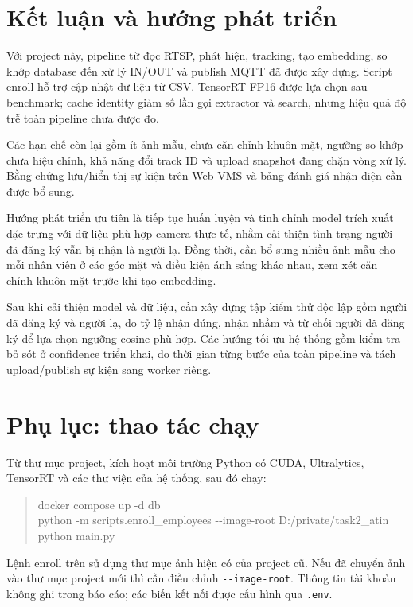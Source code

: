 \documentclass[11pt,a4paper]{article}
\begin{document}
\section{Kết luận và hướng phát triển}
Với project này, pipeline từ đọc RTSP, phát hiện, tracking, tạo embedding, so khớp database đến xử lý IN/OUT và publish MQTT đã được xây dựng. Script enroll hỗ trợ cập nhật dữ liệu từ CSV. TensorRT FP16 được lựa chọn sau benchmark; cache identity giảm số lần gọi extractor và search, nhưng hiệu quả độ trễ toàn pipeline chưa được đo.

Các hạn chế còn lại gồm ít ảnh mẫu, chưa căn chỉnh khuôn mặt, ngưỡng so khớp chưa hiệu chỉnh, khả năng đổi track ID và upload snapshot đang chặn vòng xử lý. Bằng chứng lưu/hiển thị sự kiện trên Web VMS và bảng đánh giá nhận diện cần được bổ sung.

Hướng phát triển ưu tiên là tiếp tục huấn luyện và tinh chỉnh model trích xuất đặc trưng với dữ liệu phù hợp camera thực tế, nhằm cải thiện tình trạng người đã đăng ký vẫn bị nhận là người lạ. Đồng thời, cần bổ sung nhiều ảnh mẫu cho mỗi nhân viên ở các góc mặt và điều kiện ánh sáng khác nhau, xem xét căn chỉnh khuôn mặt trước khi tạo embedding.

Sau khi cải thiện model và dữ liệu, cần xây dựng tập kiểm thử độc lập gồm người đã đăng ký và người lạ, đo tỷ lệ nhận đúng, nhận nhầm và từ chối người đã đăng ký để lựa chọn ngưỡng cosine phù hợp. Các hướng tối ưu hệ thống gồm kiểm tra bỏ sót ở confidence triển khai, đo thời gian từng bước của toàn pipeline và tách upload/publish sự kiện sang worker riêng.

\clearpage
\section*{Phụ lục: thao tác chạy}
Từ thư mục project, kích hoạt môi trường Python có CUDA, Ultralytics, TensorRT và các thư viện của hệ thống, sau đó chạy:
\begin{quote}\small\ttfamily
docker compose up -d db\\
python -m scripts.enroll\_employees -{}-image-root D:/private/task2\_atin\\
python main.py
\end{quote}
Lệnh enroll trên sử dụng thư mục ảnh hiện có của project cũ. Nếu đã chuyển ảnh vào thư mục project mới thì cần điều chỉnh \texttt{-{}-image-root}. Thông tin tài khoản không ghi trong báo cáo; các biến kết nối được cấu hình qua \texttt{.env}.
\end{document}
